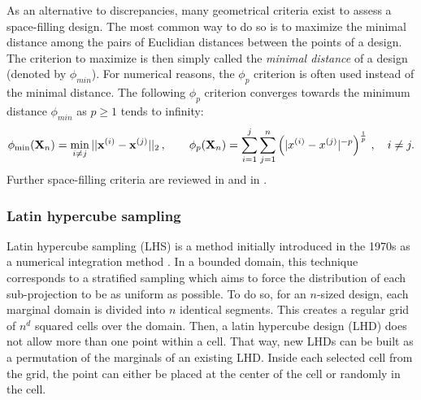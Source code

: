 As an alternative to discrepancies, many geometrical criteria exist to assess a space-filling design. 
The most common way to do so is to maximize the minimal distance among the pairs of Euclidian distances between the points of a design.  
The criterion to maximize is then simply called the \textit{minimal distance} of a design (denoted by $\phi_{min}$). 
For numerical reasons, the $\phi_p$ criterion is often used instead of the minimal distance. 
The following $\phi_p$ criterion converges towards the minimum distance $\phi_{min}$ as $p\geq1$ tends to infinity:
\begin{equation} 
    \phi_{\min}({\bf X}_n) = \min_{i \neq j} ||{\bf x}^{(i)} - {\bf x}^{(j)}||_2\, , \qquad
    \phi_p({\bf X}_n) = \sum_{i=1}^{j} \sum_{j=1}^{n} \left( |x^{(i)} - x^{(j)}|^{-p} \right)^{\frac{1}{p}}\, , \quad i \ne j.
\end{equation}
Further space-filling criteria are reviewed in \citet{abtini_2018} and in \citet[Appendix A]{daveiga_iooss_2021}. 


\subsubsection{Latin hypercube sampling}
Latin hypercube sampling (LHS) is a method initially introduced in the 1970s as a numerical integration method \citep{mckay_beckman_1979}. 
In a bounded domain, this technique corresponds to a stratified sampling which aims to force the distribution of each sub-projection to be as uniform as possible. 
To do so, for an $n$-sized design, each marginal domain is divided into $n$ identical segments. 
This creates a regular grid of $n^{d}$ squared cells over the domain. 
Then, a latin hypercube design (LHD) does not allow more than one point within a cell. 
That way, new LHDs can be built as a permutation of the marginals of an existing LHD. 
Inside each selected cell from the grid, the point can either be placed at the center of the cell or randomly in the cell.

